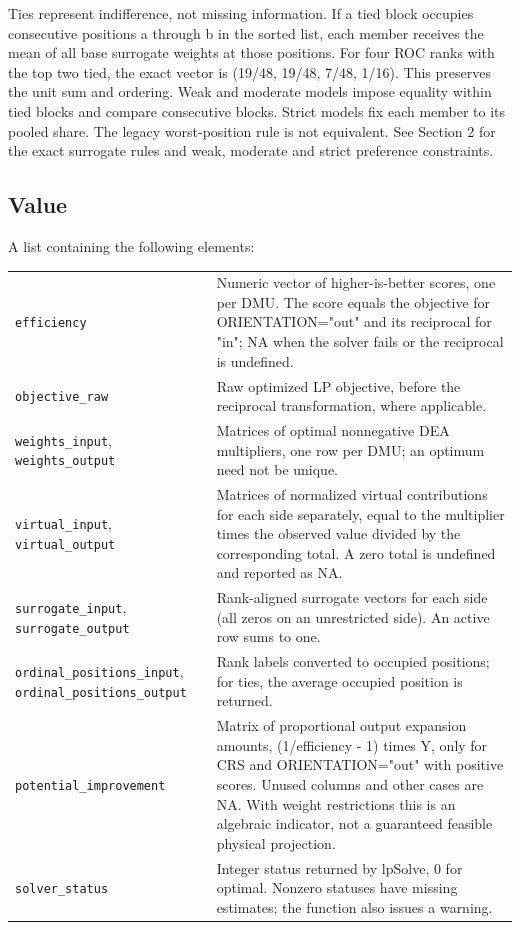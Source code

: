 \documentclass[10pt,a4paper]{article}
\newcommand{\field}[1]{\needspace{3\baselineskip}\subsection*{#1}}
\begin{document}
Ties represent indifference, not missing information. If a tied block occupies consecutive positions a through b in the sorted list, each member receives the mean of all base surrogate weights at those positions. For four ROC ranks with the top two tied, the exact vector is (19/48, 19/48, 7/48, 1/16). This preserves the unit sum and ordering. Weak and moderate models impose equality within tied blocks and compare consecutive blocks. Strict models fix each member to its pooled share. The legacy worst-position rule is not equivalent.
See Section 2 for the exact surrogate rules and weak, moderate and strict preference constraints.
\field{Value}
A list containing the following elements:
\begin{longtable}{@{}p{53mm}p{106mm}@{}}
\texttt{efficiency} & Numeric vector of higher-is-better scores, one per DMU. The score equals the objective for ORIENTATION="out" and its reciprocal for "in"; NA when the solver fails or the reciprocal is undefined. \\[2pt]
\texttt{objective\_raw} & Raw optimized LP objective, before the reciprocal transformation, where applicable. \\[2pt]
\texttt{weights\_input}, \texttt{weights\_output} & Matrices of optimal nonnegative DEA multipliers, one row per DMU; an optimum need not be unique. \\[2pt]
\texttt{virtual\_input}, \texttt{virtual\_output} & Matrices of normalized virtual contributions for each side separately, equal to the multiplier times the observed value divided by the corresponding total. A zero total is undefined and reported as NA. \\[2pt]
\texttt{surrogate\_input}, \texttt{surrogate\_output} & Rank-aligned surrogate vectors for each side (all zeros on an unrestricted side). An active row sums to one. \\[2pt]
\texttt{ordinal\_positions\_input}, \texttt{ordinal\_positions\_output} & Rank labels converted to occupied positions; for ties, the average occupied position is returned. \\[2pt]
\texttt{potential\_improvement} & Matrix of proportional output expansion amounts, (1/efficiency - 1) times Y, only for CRS and ORIENTATION="out" with positive scores. Unused columns and other cases are NA. With weight restrictions this is an algebraic indicator, not a guaranteed feasible physical projection. \\[2pt]
\texttt{solver\_status} & Integer status returned by lpSolve, 0 for optimal. Nonzero statuses have missing estimates; the function also issues a warning. \\[2pt]

\end{longtable}
\end{document}
